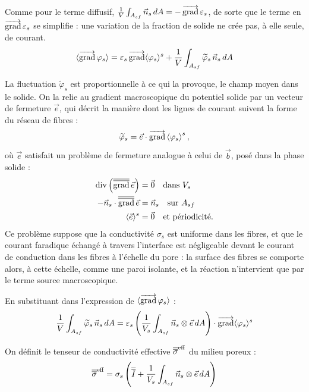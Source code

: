 Comme pour le terme diffusif, $\frac{1}{V}\int_{A_{sf}} \vec{n}_s\, dA = -\mathop{\overrightarrow{\operatorname{grad}}}\nolimits\varepsilon_s$,
de sorte que le terme en $\mathop{\overrightarrow{\operatorname{grad}}}\nolimits\varepsilon_s$ se simplifie : une variation de
la fraction de solide ne crée pas, à elle seule, de courant.
\begin{equation}
\langle \mathop{\overrightarrow{\operatorname{grad}}}\nolimits\varphi_s \rangle
= \varepsilon_s \mathop{\overrightarrow{\operatorname{grad}}}\nolimits\langle \varphi_s \rangle^s + \frac{1}{V}\int_{A_{sf}} \widetilde{\varphi}_s\,\vec{n}_s\, dA
\end{equation}

La fluctuation $\widetilde{\varphi}_s$ est proportionnelle à ce qui la
provoque, le champ moyen dans le solide. On la relie au gradient
macroscopique du potentiel solide par un vecteur de fermeture $\vec{e}$, qui
décrit la manière dont les lignes de courant suivent la forme du réseau de
fibres :
\begin{equation}
\widetilde{\varphi}_s
=
\vec{e} \cdot \mathop{\overrightarrow{\operatorname{grad}}}\nolimits \left\langle \varphi_s \right\rangle^s ,
\end{equation}
où $\vec{e}$ satisfait un problème de fermeture analogue à celui de $\vec{b}$,
posé dans la phase solide :
\begin{align}
\operatorname{div}\left(\mathop{\overline{\overline{\operatorname{grad}}}}\nolimits \vec{e}\right) &= \vec{0} \quad \text{dans } V_s \\
-\vec{n}_s\cdot\mathop{\overline{\overline{\operatorname{grad}}}}\nolimits\vec{e} &= \vec{n}_s \quad \text{sur } A_{sf}\\
\langle \vec{e} \rangle^s &= \vec{0} \quad \text{et périodicité.}
\end{align}
Ce problème suppose que la conductivité $\sigma_s$ est uniforme dans les
fibres, et que le courant faradique échangé à travers l'interface est
négligeable devant le courant de conduction dans les fibres à l'échelle du
pore : la surface des fibres se comporte alors, à cette échelle, comme une
paroi isolante, et la réaction n'intervient que par le terme source
macroscopique.

En substituant dans l'expression de $\langle \mathop{\overrightarrow{\operatorname{grad}}}\nolimits\varphi_s \rangle$ :
\begin{equation}
\frac{1}{V}\int_{A_{sf}} \widetilde{\varphi}_s\,\vec{n}_s\, dA
= \varepsilon_s \left(\frac{1}{V_s} \int_{A_{sf}} \vec{n}_s\otimes\vec{e}\, dA\right)\cdot\mathop{\overrightarrow{\operatorname{grad}}}\nolimits\langle \varphi_s \rangle^s
\end{equation}

On définit le tenseur de conductivité effective $\overline{\overline{\sigma}}^{\text{eff}}$ du milieu poreux :
\begin{equation}
\overline{\overline{\sigma}}^{\text{eff}} = \sigma_s \left(\overline{\overline{I}} + \frac{1}{V_s}\int_{A_{sf}} \vec{n}_s\otimes\vec{e}\, dA \right)
\end{equation}

